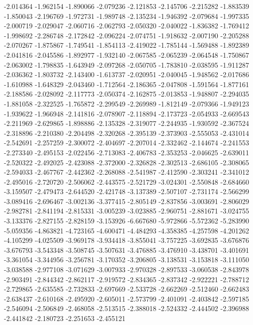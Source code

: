 -2.014364
-1.962154
-1.890066
-2.079236
-2.121853
-2.145706
-2.215282
-1.883539
-1.850043
-2.196769
-1.972731
-1.989748
-2.135234
-1.946392
-2.079684
-1.997335
-2.000719
-2.029047
-2.060716
-2.062793
-2.050320
-2.040022
-1.836382
-1.769412
-1.998692
-2.286748
-2.172842
-2.096224
-2.074751
-1.918632
-2.007190
-2.205288
-2.070267
-1.875867
-1.749541
-1.854113
-2.419022
-1.785144
-1.569488
-1.892389
-2.041816
-2.045586
-1.892977
-1.932140
-2.067585
-2.065239
-2.064548
-1.750867
-2.063002
-1.798835
-1.643949
-2.097268
-2.050705
-1.783810
-2.038595
-1.911287
-2.036362
-1.803732
-2.143400
-1.613737
-2.020951
-2.040045
-1.948562
-2.017686
-1.610988
-1.648329
-2.043460
-1.712564
-2.186365
-2.047808
-1.591564
-1.877161
-2.188586
-2.028092
-2.117773
-2.050374
-2.162875
-2.013853
-1.948807
-2.294035
-1.881058
-2.322525
-1.765872
-2.299549
-2.269989
-1.812149
-2.079366
-1.949123
-1.939622
-1.966948
-2.141816
-2.078907
-2.118894
-2.173723
-2.054933
-2.669543
-2.211969
-2.629865
-1.898886
-2.135328
-2.319077
-2.244935
-1.930592
-2.367524
-2.318896
-2.210380
-2.204498
-2.320268
-2.395139
-2.373903
-2.555053
-2.431014
-2.542691
-2.257259
-2.300072
-2.404697
-2.207014
-2.332462
-2.144674
-2.241553
-2.273340
-2.495153
-2.022456
-2.713083
-2.406783
-2.353253
-2.046625
-2.639011
-2.520322
-2.492025
-2.423088
-2.372000
-2.326828
-2.302513
-2.686105
-2.308065
-2.594033
-2.467767
-2.442362
-2.268088
-2.541987
-2.412590
-2.303241
-2.341012
-2.495016
-2.720720
-2.506062
-2.443575
-2.521729
-3.024301
-2.550848
-2.684660
-3.159507
-2.479473
-2.644520
-2.421748
-3.137389
-2.507107
-2.731174
-2.566299
-3.089416
-2.696467
-3.002136
-3.377415
-2.805149
-2.837856
-3.003691
-2.806029
-2.982781
-2.841194
-2.815331
-3.005239
-3.023885
-2.960751
-2.881671
-3.024755
-3.133376
-2.827155
-2.828159
-3.153926
-6.667680
-5.972866
-5.572362
-5.283990
-5.059356
-4.863821
-4.723165
-4.600471
-4.484293
-4.358385
-4.257598
-4.201262
-4.105299
-4.025509
-3.969178
-3.934418
-3.855041
-3.757225
-3.692835
-3.676876
-3.676793
-3.543348
-3.508745
-3.507631
-3.476885
-3.476910
-3.438701
-3.401691
-3.361054
-3.344956
-3.256781
-3.170352
-3.206805
-3.138531
-3.153818
-3.111050
-3.038588
-2.977108
-3.071629
-3.007933
-2.970328
-2.897533
-3.060538
-2.843978
-2.903491
-2.844342
-2.862117
-2.919572
-2.834365
-2.837342
-2.922221
-2.788712
-2.729865
-2.635585
-2.732833
-2.697669
-2.533728
-2.662269
-2.512460
-2.662483
-2.638437
-2.610168
-2.495920
-2.605011
-2.573799
-2.401091
-2.403842
-2.597185
-2.546094
-2.506849
-2.468058
-2.513515
-2.388018
-2.524332
-2.444502
-2.396988
-2.441842
-2.180723
-2.251653
-2.455121
